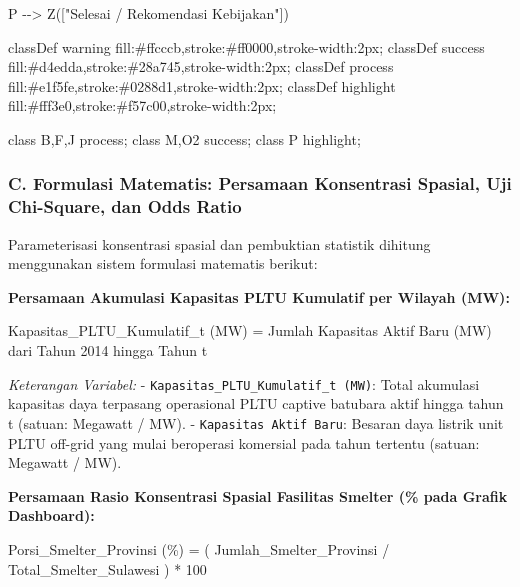 \documentclass[
]{article}
\newenvironment{Shaded}{}{}
\newcommand{\NormalTok}[1]{#1}
\begin{document}
\begin{Shaded}
\begin{Highlighting}[]
\NormalTok{    P {-}{-}\textgreater{} Z(["Selesai / Rekomendasi Kebijakan"])}

\NormalTok{    classDef warning fill:\#ffcccb,stroke:\#ff0000,stroke{-}width:2px;}
\NormalTok{    classDef success fill:\#d4edda,stroke:\#28a745,stroke{-}width:2px;}
\NormalTok{    classDef process fill:\#e1f5fe,stroke:\#0288d1,stroke{-}width:2px;}
\NormalTok{    classDef highlight fill:\#fff3e0,stroke:\#f57c00,stroke{-}width:2px;}
    
\NormalTok{    class B,F,J process;}
\NormalTok{    class M,O2 success;}
\NormalTok{    class P highlight;}
\end{Highlighting}
\end{Shaded}

\subsubsection{C. Formulasi Matematis: Persamaan Konsentrasi Spasial,
Uji Chi-Square, dan Odds
Ratio}\label{c.-formulasi-matematis-persamaan-konsentrasi-spasial-uji-chi-square-dan-odds-ratio}

Parameterisasi konsentrasi spasial dan pembuktian statistik dihitung
menggunakan sistem formulasi matematis berikut:

\textbf{Persamaan Akumulasi Kapasitas PLTU Kumulatif per Wilayah (MW):}

\begin{Shaded}
\begin{Highlighting}[]
\NormalTok{Kapasitas\_PLTU\_Kumulatif\_t (MW) = Jumlah Kapasitas Aktif Baru (MW) dari Tahun 2014 hingga Tahun t}
\end{Highlighting}
\end{Shaded}

\emph{Keterangan Variabel:} -
\texttt{Kapasitas\_PLTU\_Kumulatif\_t\ (MW)}: Total akumulasi kapasitas
daya terpasang operasional PLTU captive batubara aktif hingga tahun t
(satuan: Megawatt / MW). - \texttt{Kapasitas\ Aktif\ Baru}: Besaran daya
listrik unit PLTU off-grid yang mulai beroperasi komersial pada tahun
tertentu (satuan: Megawatt / MW).

\textbf{Persamaan Rasio Konsentrasi Spasial Fasilitas Smelter (\% pada
Grafik Dashboard):}

\begin{Shaded}
\begin{Highlighting}[]
\NormalTok{Porsi\_Smelter\_Provinsi (\%) = ( Jumlah\_Smelter\_Provinsi / Total\_Smelter\_Sulawesi ) * 100}
\end{Highlighting}
\end{Shaded}
\end{document}
